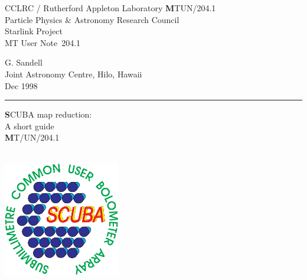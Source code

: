 \documentclass[twoside,11pt]{article}
\newcommand{\stardoccategory}  {MT User Note}
\newcommand{\stardocinitials}  {MTUN}
\newcommand{\stardocnumber}    {204.1}
\newcommand{\stardocauthors}   {G. Sandell \\ \jac}
\newcommand{\stardocdate}      {Dec 1998}
\newcommand{\stardoctitle}     {SCUBA map reduction:\\[2ex]
                                A short guide}
\newcommand{\stardocversion}   {MT/UN/204.1}
\newcommand{\stardocmanual}    {\ }
\newcommand{\jac}{\htmladdnormallink{Joint Astronomy Centre}{http://www.jach.hawaii.edu},
 Hilo, Hawaii}
\newcommand{\stardocname}{\stardocinitials /\stardocnumber}
\newcommand{\htmladdnormallink}[2]{#1}
\newenvironment{latexonly}{}{}
\renewcommand{\_}{\texttt{\symbol{95}}}
\begin{document}
\thispagestyle{empty}

\begin{latexonly}
   CCLRC / {\textsc Rutherford Appleton Laboratory} \hfill {\textbf \stardocname}\\
   {\large Particle Physics \& Astronomy Research Council}\\
   {\large Starlink Project\\}
   {\large \stardoccategory\ \stardocnumber}
   \begin{flushright}
   \stardocauthors\\
   \stardocdate
   \end{flushright}
   \vspace{-4mm}
   \rule{\textwidth}{0.5mm}
   \vspace{5mm}
   \begin{center}
   {\Huge\textbf  \stardoctitle \\ [2.5ex]}
   {\LARGE\textbf \stardocversion \\ [4ex]}
   {\Huge\textbf  \stardocmanual}
   \end{center}

\begin{center}
\includegraphics[width=2.0in]{sc11_logo.eps}
\end{center}

\end{latexonly}
\end{document}
